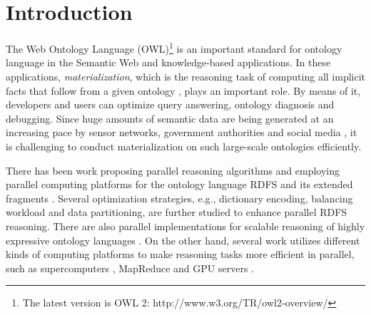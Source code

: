 \documentclass[final,1p,times]{elsarticle}
\begin{document}


\section{Introduction}
\label{sec:introduction}

The Web Ontology Language (OWL)\footnote{The latest version is OWL 2: http://www.w3.org/TR/owl2-overview/}
is an important standard for ontology language in the Semantic Web and knowledge-based applications.
In these applications, \emph{materialization}, which is the reasoning task of computing all implicit
facts that follow from a given ontology \cite{handbook}, plays an important role. By means of it, developers and users
can optimize query answering, ontology diagnosis and debugging. Since huge amounts of semantic data
are being generated at an increasing pace by sensor networks, government authorities and social
media \cite{LehmbergRMB16,MeuselBP15}, it is challenging to conduct materialization on such large-scale ontologies efficiently.

There has been work proposing parallel reasoning algorithms and employing parallel computing platforms
for the ontology language RDFS and its extended
fragments \cite{MotikNPHO14,PetersSZ15,SubercazeGCL16}. Several optimization strategies, e.g., dictionary encoding, balancing workload
and data partitioning, are further studied to enhance parallel RDFS reasoning. There are also parallel implementations for scalable
reasoning of highly expressive ontology languages \cite{SteigmillerLG14,WuH12}. On the other hand, several work utilizes different kinds of computing platforms to make reasoning tasks more efficient in parallel, such as supercomputers \cite{Hoeksema2011,GoodmanJMAAH11},
MapReduce \cite{UrbaniKMHB12} and GPU servers \cite{HeinoP12}.
\end{document}
